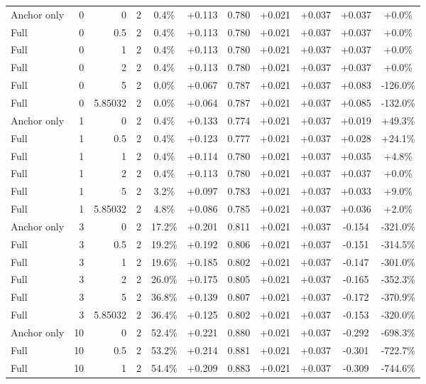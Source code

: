 \begin{table}[htbp]
\begin{tabular}{lrrrccccccc}
Anchor only & 0 & 0 & 2 & 0.4\% & +0.113 & 0.780 & +0.021 & +0.037 & +0.037 & +0.0\% \\
Full & 0 & 0.5 & 2 & 0.4\% & +0.113 & 0.780 & +0.021 & +0.037 & +0.037 & +0.0\% \\
Full & 0 & 1 & 2 & 0.4\% & +0.113 & 0.780 & +0.021 & +0.037 & +0.037 & +0.0\% \\
Full & 0 & 2 & 2 & 0.4\% & +0.113 & 0.780 & +0.021 & +0.037 & +0.037 & +0.0\% \\
Full & 0 & 5 & 2 & 0.0\% & +0.067 & 0.787 & +0.021 & +0.037 & +0.083 & -126.0\% \\
Full & 0 & 5.85032 & 2 & 0.0\% & +0.064 & 0.787 & +0.021 & +0.037 & +0.085 & -132.0\% \\
Anchor only & 1 & 0 & 2 & 0.4\% & +0.133 & 0.774 & +0.021 & +0.037 & +0.019 & +49.3\% \\
Full & 1 & 0.5 & 2 & 0.4\% & +0.123 & 0.777 & +0.021 & +0.037 & +0.028 & +24.1\% \\
Full & 1 & 1 & 2 & 0.4\% & +0.114 & 0.780 & +0.021 & +0.037 & +0.035 & +4.8\% \\
Full & 1 & 2 & 2 & 0.4\% & +0.113 & 0.780 & +0.021 & +0.037 & +0.037 & +0.0\% \\
Full & 1 & 5 & 2 & 3.2\% & +0.097 & 0.783 & +0.021 & +0.037 & +0.033 & +9.0\% \\
Full & 1 & 5.85032 & 2 & 4.8\% & +0.086 & 0.785 & +0.021 & +0.037 & +0.036 & +2.0\% \\
Anchor only & 3 & 0 & 2 & 17.2\% & +0.201 & 0.811 & +0.021 & +0.037 & -0.154 & -321.0\% \\
Full & 3 & 0.5 & 2 & 19.2\% & +0.192 & 0.806 & +0.021 & +0.037 & -0.151 & -314.5\% \\
Full & 3 & 1 & 2 & 19.6\% & +0.185 & 0.802 & +0.021 & +0.037 & -0.147 & -301.0\% \\
Full & 3 & 2 & 2 & 26.0\% & +0.175 & 0.805 & +0.021 & +0.037 & -0.165 & -352.3\% \\
Full & 3 & 5 & 2 & 36.8\% & +0.139 & 0.807 & +0.021 & +0.037 & -0.172 & -370.9\% \\
Full & 3 & 5.85032 & 2 & 36.4\% & +0.125 & 0.802 & +0.021 & +0.037 & -0.153 & -320.0\% \\
Anchor only & 10 & 0 & 2 & 52.4\% & +0.221 & 0.880 & +0.021 & +0.037 & -0.292 & -698.3\% \\
Full & 10 & 0.5 & 2 & 53.2\% & +0.214 & 0.881 & +0.021 & +0.037 & -0.301 & -722.7\% \\
Full & 10 & 1 & 2 & 54.4\% & +0.209 & 0.883 & +0.021 & +0.037 & -0.309 & -744.6\% \\

\end{tabular}
\end{table}
